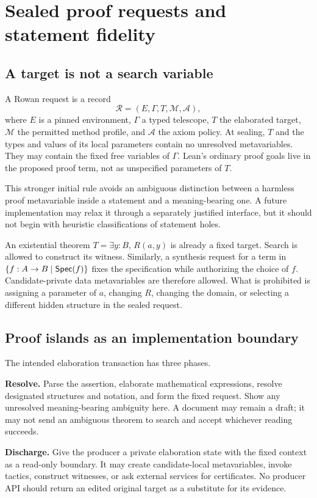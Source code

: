 \documentclass[11pt,letterpaper]{article}
\theoremstyle{definition}\newtheorem{definition}[theorem]{Definition}
\theoremstyle{remark}\newtheorem{remark}[theorem]{Remark}
\begin{document}
\section{Sealed proof requests and statement fidelity}
\label{sec:islands}

\subsection{A target is not a search variable}
A Rowan request is a record
\[
 \mathcal R=(E,\Gamma,T,\mathcal M,\mathcal A),
\]
where $E$ is a pinned environment, $\Gamma$ a typed telescope, $T$ the
elaborated target, $\mathcal M$ the permitted method profile, and $\mathcal A$
the axiom policy. At sealing, $T$ and the types and values of its local
parameters contain no unresolved metavariables. They may contain the fixed
free variables of $\Gamma$. Lean's ordinary proof goals live in the proposed
proof term, not as unspecified parameters of $T$.

This stronger initial rule avoids an ambiguous distinction between a harmless
proof metavariable inside a statement and a meaning-bearing one. A future
implementation may relax it through a separately justified interface, but it
should not begin with heuristic classifications of statement holes.

An existential theorem $T=\exists y:B,\,R(a,y)$ is already a fixed target.
Search is allowed to construct its witness. Similarly, a synthesis request for
a term in $\{f:A\to B\mid\mathsf{Spec}(f)\}$ fixes the specification while authorizing
the choice of $f$. Candidate-private data metavariables are therefore allowed.
What is prohibited is assigning a parameter of $a$, changing $R$, changing the
domain, or selecting a different hidden structure in the sealed request.

\subsection{Proof islands as an implementation boundary}
The intended elaboration transaction has three phases.

\textbf{Resolve.} Parse the assertion, elaborate mathematical expressions,
resolve designated structures and notation, and form the fixed request. Show
any unresolved meaning-bearing ambiguity here. A document may remain a draft;
it may not send an ambiguous theorem to search and accept whichever reading
succeeds.

\textbf{Discharge.} Give the producer a private elaboration state with the
fixed context as a read-only boundary. It may create candidate-local
metavariables, invoke tactics, construct witnesses, or ask external services
for certificates. No producer API should return an edited original target as
a substitute for its evidence.
\end{document}
